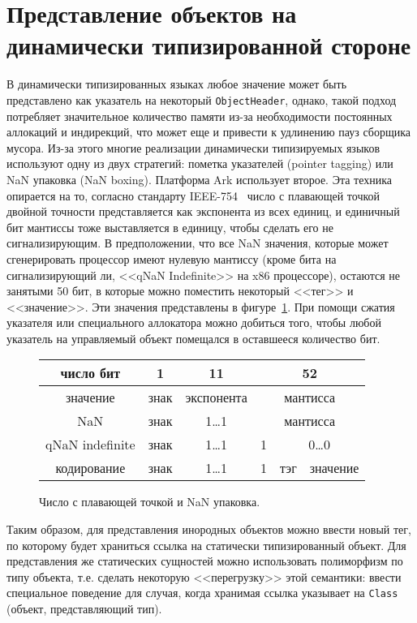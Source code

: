 \documentclass[times
]{itmo-student-thesis}
\begin{document}
\section{Представление объектов на динамически типизированной стороне}\label{nan-boxing-explanation}
В динамически типизированных языках любое значение может быть представлено как указатель на некоторый \texttt{ObjectHeader}, однако, такой подход потребляет значительное количество памяти из-за необходимости постоянных аллокаций и индирекций, что может еще и привести к удлинению пауз сборщика мусора. Из-за этого многие реализации динамически типизируемых языков~\cite{luajit-nan-box,v8-pointer-tagging} используют одну из двух стратегий: пометка указателей (pointer tagging) или NaN упаковка (NaN boxing). Платформа Ark использует второе. Эта техника опирается на то, согласно стандарту IEEE-754~\cite{cowlishaw2008standard} число с плавающей точкой двойной точности представляется как экспонента из всех единиц, и единичный бит мантиссы тоже выставляется в единицу, чтобы сделать его не сигнализирующим. В предположении, что все NaN значения, которые может сгенерировать процессор имеют нулевую мантиссу (кроме бита на сигнализирующий ли, <<qNaN Indefinite>> на x86 процессоре), остаются не занятыми 50 бит, в которые можно поместить некоторый <<тег>> и <<значение>>. Эти значения представлены в фигуре~\ref{fig:nan-explain}. При помощи сжатия указателя или специального аллокатора можно добиться того, чтобы любой указатель на управляемый объект помещался в оставшееся количество бит.\par
\begin{figure}[!h]
	\caption{Число с плавающей точкой и NaN упаковка.}\label{fig:nan-explain}
	\centering
	\begin{tabular}{|c|c|c|c|c|c|}
		\hline
		число бит & 1 & 11 & \multicolumn{3}{c|}{52} \\
		\hline
		значение & знак & экспонента & \multicolumn{3}{c|}{мантисса} \\
		\hline
		NaN & знак & 1\dots 1 & \multicolumn{3}{c|}{мантисса} \\
		\hline
		qNaN indefinite & знак & 1\dots 1 & 1 & \multicolumn{2}{c|}{0\dots0} \\
		\hline
		кодирование & знак & 1\dots 1 & 1 & тэг & значение \\
		\hline
	\end{tabular}
\end{figure}
Таким образом, для представления инородных объектов можно ввести новый тег, по которому будет храниться ссылка на статически типизированный объект. Для представления же статических сущностей можно использовать полиморфизм по типу объекта, т.е. сделать некоторую <<перегрузку>> этой семантики: ввести специальное поведение для случая, когда хранимая ссылка указывает на \texttt{Class} (объект, представляющий тип).
\end{document}
